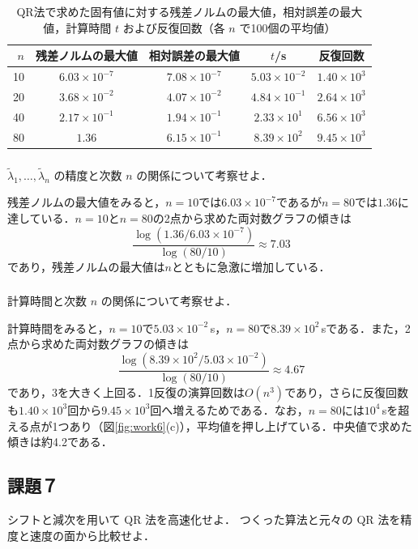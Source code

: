 \documentclass{jarticle}
\begin{document}
\begin{table}[htbp]
    \centering
    \footnotesize\setlength{\tabcolsep}{3pt}
    \caption{QR法で求めた固有値に対する残差ノルムの最大値，相対誤差の最大値，計算時間 $t$ および反復回数（各 $n$ で100個の平均値）}
    \label{tab:work6}
    \begin{tabular}{rcccc}
        \hline
        $n$ & 残差ノルムの最大値 & 相対誤差の最大値 & $t$/s & 反復回数 \\
        \hline
        10 & $6.03\times10^{-7}$ & $7.08\times10^{-7}$ & $5.03\times10^{-2}$ & $1.40\times10^{3}$ \\
        20 & $3.68\times10^{-2}$ & $4.07\times10^{-2}$ & $4.84\times10^{-1}$ & $2.64\times10^{3}$ \\
        40 & $2.17\times10^{-1}$ & $1.94\times10^{-1}$ & $2.33\times10^{1}$ & $6.56\times10^{3}$ \\
        80 & $1.36$ & $6.15\times10^{-1}$ & $8.39\times10^{2}$ & $9.45\times10^{3}$ \\
        \hline
    \end{tabular}
\end{table}

\subsubsection{}
$\tilde{\lambda}_1, \ldots, \tilde{\lambda}_n$ の精度と次数 $n$ の関係について考察せよ．

残差ノルムの最大値をみると，$n=10$では$6.03\times10^{-7}$であるが$n=80$では$1.36$に達している．$n=10$と$n=80$の2点から求めた両対数グラフの傾きは
\[
    \frac{\log(1.36/6.03\times10^{-7})}{\log(80/10)} \approx 7.03
\]
であり，残差ノルムの最大値は$n$とともに急激に増加している．
\subsubsection{}
計算時間と次数 $n$ の関係について考察せよ．

計算時間をみると，$n=10$で$5.03\times10^{-2}$\,s，$n=80$で$8.39\times10^{2}$\,sである．また，2点から求めた両対数グラフの傾きは
\[
    \frac{\log(8.39\times10^{2}/5.03\times10^{-2})}{\log(80/10)} \approx 4.67
\]
であり，3を大きく上回る．1反復の演算回数は$O(n^3)$であり，さらに反復回数も$1.40\times10^3$回から$9.45\times10^3$回へ増えるためである．なお，$n=80$には$10^4$\,sを超える点が1つあり（図\ref{fig:work6}(c)），平均値を押し上げている．中央値で求めた傾きは約4.2である．

\clearpage
\subsection{課題７}
シフトと減次を用いて QR 法を高速化せよ．
つくった算法と元々の QR 法を精度と速度の面から比較せよ．
\end{document}
